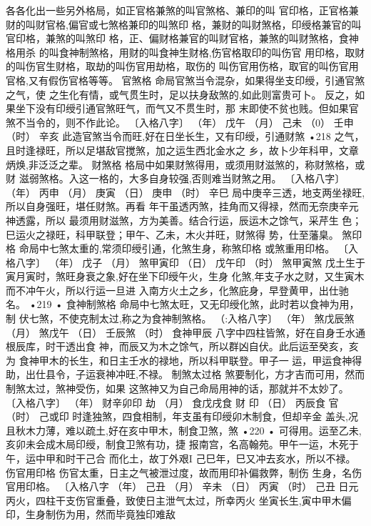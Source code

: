 各各化出一些另外格局，如正官格兼煞的叫官煞格、兼印的叫
官印格，正官格兼财的叫财官格,偏官或七煞格兼印的叫煞印
格，兼财的叫财煞格，印绶格兼官的叫官印格，兼煞的叫煞印
格，正、偏财格兼官的叫财官格，兼煞的叫财煞格，食神格用杀
的叫食神制煞格，用财的叫食神生财格,伤官格取印的叫伤官
用印格，取财的叫伤官生财格，取劫的叫伤官用劫格，取伤的
叫伤官用伤格，取官的叫伤官用官格,又有假伤官格等等。
官煞格
命局官煞当令混杂，如果得坐支印绶，引通官煞之气，使
之生化有情，或气贯生时，足以扶身敌煞的,如此则富贵可卜。
反之，如果坐下没有印绶引通官煞旺气，而气又不贯生时，那
末即使不贫也贱。但如果官煞不当令的，则不作此论。
〔入格八字〕
（年） 戊午
（月） 己未
（0） 壬申
（时） 辛亥
此造官煞当令而旺,好在日坐长生，又有印绶，引通财煞
•218
之气，且时逢禄旺，所以足堪敌官搅煞，加之运生西北金水之
乡，故卜少年科甲，文章炳焕,非泛泛之辈。
财煞格
格局中如果财煞得用，或须用财滋煞的，称财煞格，或财
滋弱煞格。入这一格的，大多自身较强,否则难当财煞之用。
〔入格八字〕
（年） 丙申
（月） 庚寅
（日） 庚申
（时） 辛巳
局中庚辛三透，地支两坐禄旺,所以自身强旺，堪任财煞。再看
年干虽透丙煞，挂角而又得禄，然而无奈庚辛元神透露，所以
最须用财滋煞，方为美善。结合行运，辰运木之馀气，采芹生
色；巳运火之禄旺，科甲联登；甲午、乙未，木火并旺，财煞得
势，仕至藩臬。
煞印格
命局中七煞太重的,常须印绶引通，化煞生身，称煞印格
或煞重用印格。
〔入格八字〕
（年） 戊子
（月） 煞甲寅印
（日） 戊午印
（时） 煞甲寅煞
戊土生于寅月寅时，煞旺身衰之象,好在坐下印绶午火，生身
化煞,年支子水之财，又生寅木而不冲午火，所以行运一旦进
入南方火土之乡，化煞庇身，早登黄甲，出仕驰名。
•219 •
食神制煞格
命局中七煞太旺，又无印绶化煞，此时若以食神为用，制
伏七煞，不使克制太过,称之为食神制煞格。
（:入格八字〕
（年） 煞戊辰煞
（月） 煞戊午
（日） 壬辰煞
（时） 食神甲辰
八字中四柱皆煞，好在自身壬水通根辰库，时干透出食
神，而辰又为木之馀气，所以群凶自伏。此后运至癸亥，亥为
食神甲木的长生，和日主壬水的禄地，所以科甲联登。甲子一
运，甲运食神得助，出仕县令，子运衰神冲旺,不禄。
制煞太过格
煞要制化，方才吉而可用，然而制煞太过，煞神受伤，如果
这煞神又为自己命局用神的话，那就并不太妙了。
〔入格八字〕
（年） 财辛卯印
劫
（月） 食戊戌食
财
印
（日） 丙辰食
官
（时） 己或印
时逢独煞，四食相制，年支虽有印绶卯木制食，但却辛金
盖头,况且秋木力薄，难以疏土,好在亥中甲木，制食卫煞，煞
•220 •
可得用。运至乙未,亥卯未会成木局印绶，制食卫煞有功，捷
报南宫，名高翰苑。甲午一运，木死于午，运中甲和时干己合
而化土，故丁外艰I 己巳年，巳又冲去亥水，所以不禄。
伤官用印格
伤官太重，日主之气被泄过度，故而用印补偏救弊，制伤
生身，名伤官用印格。
〔入格八字
（年） 己丑
（月） 辛未
（日） 丙寅
（时） 己丑
日元丙火，四柱干支伤官重叠，致使日主泄气太过，所幸丙火
坐寅长生,寅中甲木偏印，生身制伤为用，然而毕竟独印难敌
